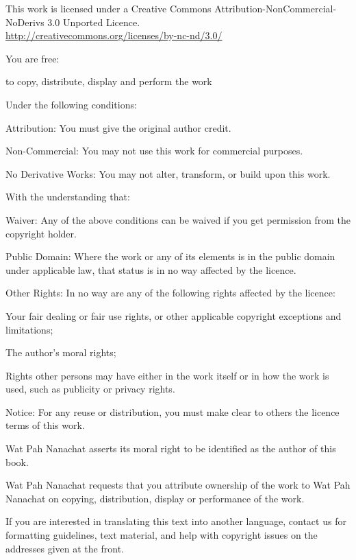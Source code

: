 
{\smaller\setlength{\parindent}{0pt}%
\raggedright\label{copyright-details}
\setlength{\parskip}{5pt}
{\centering

{\large\ccbyncnd}
\bigskip

This work is licensed under a Creative Commons Attribution-NonCommercial-NoDerivs 3.0 Unported Licence.\\
\href{http://creativecommons.org/licenses/by-nc-nd/3.0/}{http://creativecommons.org/licenses/by-nc-nd/3.0/}

}

You are free:

\begin{packeditemize}
\item to copy, distribute, display and perform the work
\end{packeditemize}

Under the following conditions:

\begin{packeditemize}
\item Attribution: You must give the original author credit.
\item Non-Commercial: You may not use this work for commercial purposes.
\item No Derivative Works: You may not alter, transform, or build upon this work.
\end{packeditemize}

With the understanding that:

\begin{packeditemize}
\item Waiver: Any of the above conditions can be waived if you get permission from the copyright holder.
\item Public Domain: Where the work or any of its elements is in the public domain under applicable law, that status is in no way affected by the licence.
\item Other Rights: In no way are any of the following rights affected by the licence:
\begin{packeditemize}
\item Your fair dealing or fair use rights, or other applicable copyright exceptions and limitations;
\item The author's moral rights;
\item Rights other persons may have either in the work itself or in how the work is used, such as publicity or privacy rights.
\end{packeditemize}
\item Notice: For any reuse or distribution, you must make clear to others the licence terms of this work.
\end{packeditemize}

Wat Pah Nanachat asserts its moral right to be identified as the author of this book.

Wat Pah Nanachat requests that you attribute ownership of the work to Wat Pah Nanachat on copying, distribution, display or performance of the work.

If you are interested in translating this text into another language, contact us for formatting guidelines, text material, and help with copyright issues on the addresses given at the front.

}
